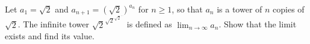 Let $a_1=\sqrt2$ and $a_{n+1}=\left(\sqrt2\right)^{a_n}$ for $n\ge1$, so that $a_n$ is a tower of $n$ copies of $\sqrt2$. The infinite tower $\sqrt2^{\sqrt2^{\sqrt2^{\cdots}}}$ is defined as $\displaystyle\lim_{n\to\infty}a_n$. Show that the limit exists and find its value.

